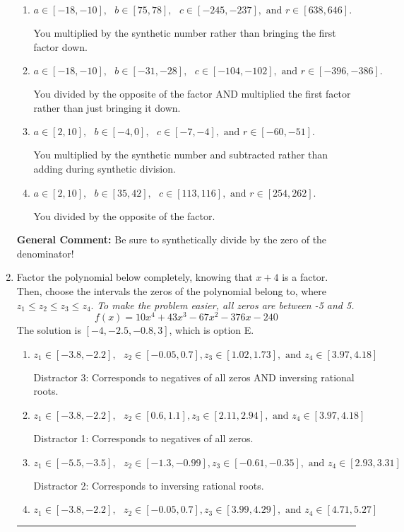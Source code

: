 \documentclass{extbook}[14pt]
\newcommand{\litem}[1]{\item #1

\rule{\textwidth}{0.4pt}}
\begin{document}
\begin{enumerate}
{\begin{enumerate}[label=\Alph*.]
* This is the solution!
\item \( a \in [-18, -10], \text{   } b \in [75, 78], \text{   } c \in [-245, -237], \text{   and   } r \in [638, 646]. \)

 You multiplied by the synthetic number rather than bringing the first factor down.
\item \( a \in [-18, -10], \text{   } b \in [-31, -28], \text{   } c \in [-104, -102], \text{   and   } r \in [-396, -386]. \)

 You divided by the opposite of the factor AND multiplied the first factor rather than just bringing it down.
\item \( a \in [2, 10], \text{   } b \in [-4, 0], \text{   } c \in [-7, -4], \text{   and   } r \in [-60, -51]. \)

 You multiplied by the synthetic number and subtracted rather than adding during synthetic division.
\item \( a \in [2, 10], \text{   } b \in [35, 42], \text{   } c \in [113, 116], \text{   and   } r \in [254, 262]. \)

 You divided by the opposite of the factor.
\end{enumerate}

\textbf{General Comment:} Be sure to synthetically divide by the zero of the denominator!
}
\litem{
Factor the polynomial below completely, knowing that $x+4$ is a factor. Then, choose the intervals the zeros of the polynomial belong to, where $z_1 \leq z_2 \leq z_3 \leq z_4$. \textit{To make the problem easier, all zeros are between -5 and 5.}
\[ f(x) = 10x^{4} +43 x^{3} -67 x^{2} -376 x -240 \]The solution is \( [-4, -2.5, -0.8, 3] \), which is option E.\begin{enumerate}[label=\Alph*.]
\item \( z_1 \in [-3.8, -2.2], \text{   }  z_2 \in [-0.05, 0.7], z_3 \in [1.02, 1.73], \text{   and   } z_4 \in [3.97, 4.18] \)

 Distractor 3: Corresponds to negatives of all zeros AND inversing rational roots.
\item \( z_1 \in [-3.8, -2.2], \text{   }  z_2 \in [0.6, 1.1], z_3 \in [2.11, 2.94], \text{   and   } z_4 \in [3.97, 4.18] \)

 Distractor 1: Corresponds to negatives of all zeros.
\item \( z_1 \in [-5.5, -3.5], \text{   }  z_2 \in [-1.3, -0.99], z_3 \in [-0.61, -0.35], \text{   and   } z_4 \in [2.93, 3.31] \)

 Distractor 2: Corresponds to inversing rational roots.
\item \( z_1 \in [-3.8, -2.2], \text{   }  z_2 \in [-0.05, 0.7], z_3 \in [3.99, 4.29], \text{   and   } z_4 \in [4.71, 5.27] \)


\end{enumerate}}
\end{enumerate}
\end{document}
